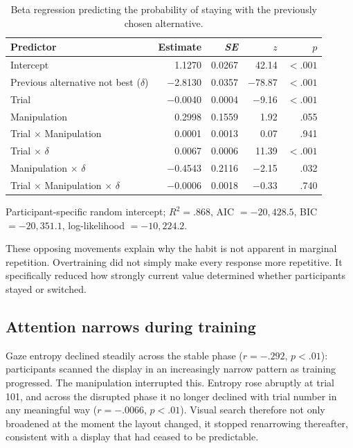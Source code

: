 \documentclass[man,natbib,floatsintext]{apa7}
\begin{document}
\begin{table}[H]
\centering
\caption{Beta regression predicting the probability of staying with the previously chosen alternative.}
\label{tab:beta-stay}
\begin{tabular}{lrrrr}
\toprule
Predictor & Estimate & \textit{SE} & $z$ & $p$ \\
\midrule
Intercept & 1.1270 & 0.0267 & 42.14 & $<.001$ \\
Previous alternative not best ($\delta$) & $-$2.8130 & 0.0357 & $-$78.87 & $<.001$ \\
Trial & $-$0.0040 & 0.0004 & $-$9.16 & $<.001$ \\
Manipulation & 0.2998 & 0.1559 & 1.92 & .055 \\
Trial $\times$ Manipulation & 0.0001 & 0.0013 & 0.07 & .941 \\
Trial $\times$ $\delta$ & 0.0067 & 0.0006 & 11.39 & $<.001$ \\
Manipulation $\times$ $\delta$ & $-$0.4543 & 0.2116 & $-$2.15 & .032 \\
Trial $\times$ Manipulation $\times$ $\delta$ & $-$0.0006 & 0.0018 & $-$0.33 & .740 \\
\bottomrule
\end{tabular}
\end{table}

\noindent Participant-specific random intercept; $R^2 = .868$, AIC $=-20{,}428.5$, BIC $=-20{,}351.1$, log-likelihood $=-10{,}224.2$.

These opposing movements explain why the habit is not apparent in marginal repetition. Overtraining did not simply make every response more repetitive. It specifically reduced how strongly current value determined whether participants stayed or switched.

\subsection{Attention narrows during training}

Gaze entropy declined steadily across the stable phase ($r=-.292$, $p<.01$): participants scanned the display in an increasingly narrow pattern as training progressed. The manipulation interrupted this. Entropy rose abruptly at trial 101, and across the disrupted phase it no longer declined with trial number in any meaningful way ($r=-.0066$, $p<.01$). Visual search therefore not only broadened at the moment the layout changed, it stopped renarrowing thereafter, consistent with a display that had ceased to be predictable.
\end{document}
